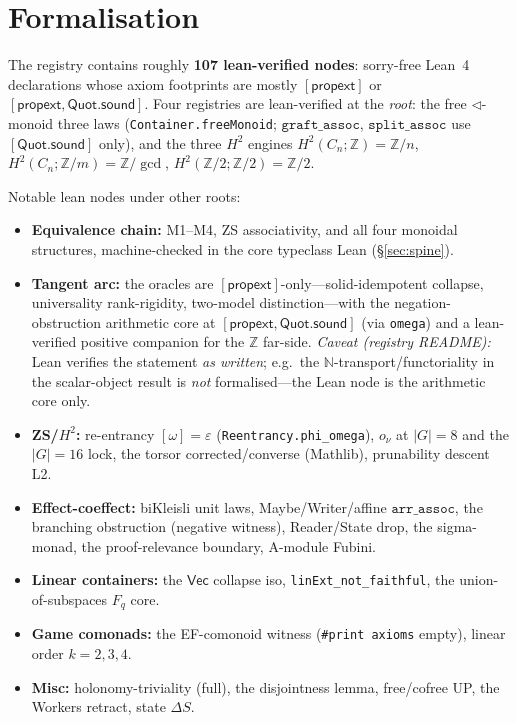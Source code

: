 \documentclass[11pt]{article}
\theoremstyle{definition}
\newcommand{\Vect}{\mathsf{Vec}}
\newcommand{\N}{\mathbb{N}}
\newcommand{\Z}{\mathbb{Z}}
\newcommand{\onu}{o_{\nu}}
\begin{document}
\section{Formalisation}
\label{sec:lean}

The registry contains roughly \textbf{107 \textsf{lean-verified} nodes}: sorry-free Lean~4
declarations whose axiom footprints are mostly $[\textsf{propext}]$ or
$[\textsf{propext},\textsf{Quot.sound}]$. Four registries are lean-verified at the \emph{root}:
the free $\lhd$-monoid three laws (\texttt{Container.freeMonoid}; $\texttt{graft\_assoc}$,
$\texttt{split\_assoc}$ use $[\textsf{Quot.sound}]$ only), and the three $H^2$ engines
$H^2(C_n;\Z)=\Z/n$, $H^2(C_n;\Z/m)=\Z/\gcd$, $H^2(\Z/2;\Z/2)=\Z/2$.

Notable lean nodes under other roots:
\begin{itemize}
\item \textbf{Equivalence chain:} M1--M4, ZS associativity, and all four monoidal structures,
machine-checked in the core typeclass Lean (\S\ref{sec:spine}).
\item \textbf{Tangent arc:} the oracles are $[\textsf{propext}]$-only---solid-idempotent collapse,
universality rank-rigidity, two-model distinction---with the negation-obstruction arithmetic core
at $[\textsf{propext},\textsf{Quot.sound}]$ (via \texttt{omega}) and a lean-verified positive
companion for the $\Z$ far-side. \emph{Caveat (registry README):} Lean verifies the statement
\emph{as written}; e.g.\ the $\N$-transport/functoriality in the scalar-object result is
\emph{not} formalised---the Lean node is the arithmetic core only.
\item \textbf{ZS/$H^2$:} re-entrancy $[\omega]=\varepsilon$ (\texttt{Reentrancy.phi\_omega}),
$\onu$ at $|G|=8$ and the $|G|=16$ lock, the torsor corrected/converse (Mathlib), prunability
descent L2.
\item \textbf{Effect-coeffect:} biKleisli unit laws, Maybe/Writer/affine $\texttt{arr\_assoc}$,
the branching obstruction (negative witness), Reader/State drop, the sigma-monad, the
proof-relevance boundary, A-module Fubini.
\item \textbf{Linear containers:} the $\Vect$ collapse iso, \texttt{linExt\_not\_faithful}, the
union-of-subspaces $F_q$ core.
\item \textbf{Game comonads:} the EF-comonoid witness (\texttt{\#print axioms} empty), linear
order $k=2,3,4$.
\item \textbf{Misc:} holonomy-triviality (full), the disjointness lemma, free/cofree UP, the
Workers retract, state $\Delta S$.
\end{itemize}
\end{document}

